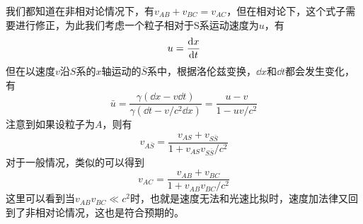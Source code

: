 \documentclass[14pt,oneside]{book}
\begin{document}
\begin{large}
我们都知道在非相对论情况下，有$v_{AB}+v_{BC}=v_{AC}$，但在相对论下，这个式子需要进行修正，为此我们考虑一个粒子相对于S系运动速度为$u$，有
\begin{equation}
  u=\dv{x}{t}
\end{equation}
但在以速度$v$沿$S$系的$x$轴运动的$\bar S$系中，根据洛伦兹变换，$\dd x$和$\dd t$都会发生变化，有
\begin{equation}
  \bar u=\frac{\gamma(\dd x-v\dd t)}{\gamma(\dd t-v/c^2\dd x)}=\frac{u-v}{1-uv/c^2}
\end{equation}
注意到如果设粒子为$A$，则有
\begin{equation}
  v_{A\bar S}=\frac{v_{AS}+v_{S\bar S}}{1+v_{AS}v_{S\bar S}/c^2}
\end{equation}
对于一般情况，类似的可以得到
\begin{equation}
  v_{AC}=\frac{v_{AB}+v_{B C}}{1+v_{AB}v_{B C}/c^2}
\end{equation}
这里可以看到当$v_{AB}v_{BC}\ll c^2$时，也就是速度无法和光速比拟时，速度加法律又回到了非相对论情况，这也是符合预期的。


\end{large}
\end{document}
